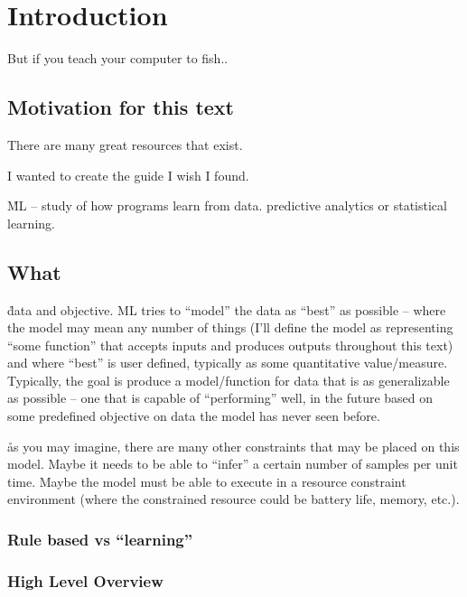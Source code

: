 \chapter{Introduction}

But if you teach your computer to fish..


\section{Motivation for this text}
There are many great resources that exist.

I wanted to create the guide I wish I found.

\r{ML -- study of how programs learn from data. predictive analytics or statistical learning.}


\section{What}

\r{data and objective. ML tries to ``model'' the data as ``best'' as possible -- where the model may mean any number of things (I'll define the model as representing ``some function'' that accepts inputs and produces outputs throughout this text) and where ``best'' is user defined, typically as some quantitative value/measure. Typically, the goal is produce a model/function for data that is as generalizable as possible -- one that is capable of ``performing'' well, in the future based on some predefined objective on data the model has never seen before.}


\r{as you may imagine, there are many other constraints that may be placed on this model. Maybe it needs to be able to ``infer'' a certain number of samples per unit time. Maybe the model must be able to execute in a resource constraint environment (where the constrained resource could be battery life, memory, etc.).}



\subsection{Rule based vs ``learning''}


\subsection{High Level Overview}



